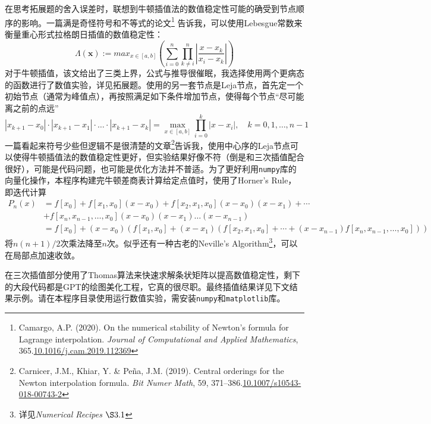 在思考拓展题的舍入误差时，联想到牛顿插值法的数值稳定性可能的确受到节点顺序的影响。一篇满是奇怪符号和不等式的论文\footnote{Camargo, A.P. (2020). On the numerical stability of Newton’s formula for Lagrange interpolation. \textit{Journal of Computational and Applied Mathematics}, 365.\href{https://doi.org/10.1016/j.cam.2019.112369}{10.1016/j.cam.2019.112369}}
告诉我，可以使用Lebesgue常数来衡量重心形式拉格朗日插值的数值稳定性：
\[
\Lambda\left(\mathbf{x}\right):=max_{x\in\left[a,b\right]}\left(\sum_{i=0}^n\prod_{k\neq i}^n\left|\frac{x-x_k}{x_i-x_k}\right|\right)
\]
对于牛顿插值，该文给出了三类上界，公式与推导很催眠，我选择使用两个更病态的函数进行了数值实验，详见拓展题。使用的另一套节点是Leja节点，首先定一个初始节点（通常为峰值点），再按照满足如下条件增加节点，使得每个节点“尽可能离之前的点远”
\[
|x_{k+1} - x_0| \cdot |x_{k+1} - x_1| \cdot \dots \cdot |x_{k+1} - x_k| = \max_{x \in [a,b]} \prod_{i=0}^{k} |x - x_i|, \quad k = 0, 1, \dots, n-1
\]
一篇看起来符号少些但逻辑不是很清楚的文章\footnote{Carnicer, J.M., Khiar, Y. \& Peña, J.M. (2019). Central orderings for the Newton interpolation formula. \textit{Bit Numer Math}, 59, 371–386.\href{https://doi.org/10.1007/s10543-018-00743-2}{10.1007/s10543-018-00743-2}}告诉我，使用中心序的Leja节点可以使得牛顿插值法的数值稳定性更好，但实验结果好像不符（倒是和三次插值配合很好），可能是代码问题，也可能是优化方法并不普适。为了更好利用\texttt{numpy}库的向量化操作，本程序构建完牛顿差商表计算给定点值时，使用了Horner's Rule，即迭代计算
\[
\begin{aligned}
P_n(x) &= f[x_0] + f[x_1, x_0](x - x_0) + f[x_2, x_1, x_0](x - x_0)(x - x_1) + \cdots\\
&+ f[x_n, x_{n-1}, \dots, x_0](x - x_0)(x - x_1)\dots(x - x_{n-1}) \\
&= f[x_0] + (x - x_0) \left( f[x_1, x_0] + (x - x_1) \left( f[x_2, x_1, x_0] + \cdots + (x - x_{n-1}) f[x_n, x_{n-1}, \dots, x_0] \right) \right)
\end{aligned}
\]
将$n(n+1)/2$次乘法降至$n$次。似乎还有一种古老的Neville's Algorithm\footnote{详见\textit{Numerical Recipes $\S 3.1$}}，可以在局部点加速收敛。

在三次插值部分使用了Thomas算法来快速求解条状矩阵以提高数值稳定性，剩下的大段代码都是GPT的绘图美化工程，它真的很尽职。最终插值结果详见下文结果示例。请在本程序目录使用运行数值实验，需安装\texttt{numpy}和\texttt{matplotlib}库。

